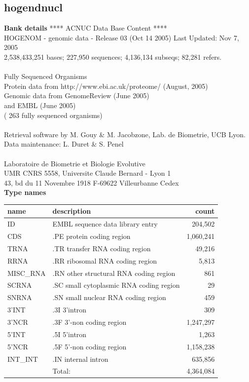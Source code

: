 \documentclass{article}
\begin{document}
\begin{Schunk}
\section{ hogendnucl }
\textbf{Bank details}
               ****     ACNUC Data Base Content      ****                      \\
  HOGENOM - genomic data - Release 03 (Oct 14 2005) Last Updated: Nov  7, 2005\\
2,538,433,251 bases; 227,950 sequences; 4,136,134 subseqs; 82,281 refers.\\
                                                                               \\
                        Fully Sequenced Organisms\\
   Protein data from http://www.ebi.ac.uk/proteome/ (August, 2005)\\
          Genomic data from GenomeReview  (June 2005) \\
                  and  EMBL (June 2005)\\
	   ( 263 fully sequenced organisms)\\
\\
Retrieval software by M. Gouy \& M. Jacobzone, Lab. de Biometrie, UCB Lyon.\\
Data maintenance: L. Duret \& S. Penel\\
\\
Laboratoire de Biometrie et Biologie Evolutive\\
UMR CNRS 5558, Universite Claude Bernard - Lyon 1 \\
43, bd du 11 Novembre 1918 F-69622 Villeurbanne Cedex\\


\textbf{Type names}
\noindent\begin{tabular}{llr}
\hline \hline
name & description & count \\
\hline
ID  &  EMBL sequence data library entry  &  204,502 \\
CDS  &  .PE protein coding region  &  1,060,241 \\
TRNA  &  .TR transfer RNA coding region  &  49,216 \\
RRNA  &  .RR ribosomal RNA coding region  &  5,813 \\
MISC\_RNA  &  .RN other structural RNA coding region  &  861 \\
SCRNA  &  .SC small cytoplasmic RNA coding region  &  29 \\
SNRNA  &  .SN small nuclear RNA coding region  &  459 \\
3'INT  &  .3I 3'intron  &  309 \\
3'NCR  &  .3F  3'-non coding region  &  1,247,297 \\
5'INT  &  .5I 5'intron  &  1,263 \\
5'NCR  &  .5F  5'-non coding region  &  1,158,238 \\
INT\_INT  &  .IN  internal intron  &  635,856 \\
\hline
 & Total: & 4,364,084 \\
\hline \hline
\end{tabular}


\end{Schunk}
\end{document}
